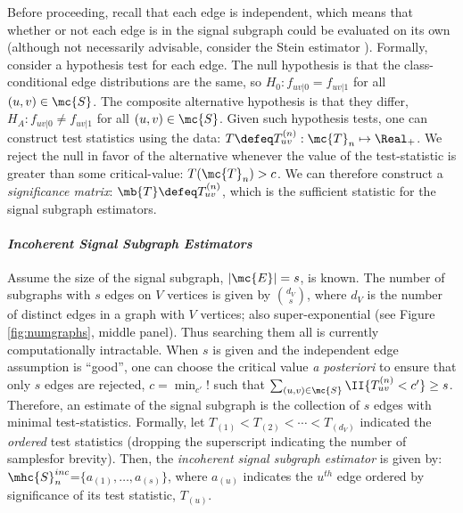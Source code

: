 \documentclass[10pt,journal,cspaper,compsoc]{IEEEtran}
\begin{document}
Before proceeding, recall that each edge is independent, which means that whether or not each edge is in the signal subgraph could be evaluated on its own (although not necessarily advisable, consider the Stein estimator \cite{Stein1956}).  Formally, consider a hypothesis test for each edge.  The null hypothesis is that the class-conditional edge distributions are the same, so $H_0: f_{uv|0}=f_{uv|1}$ for all $(u,v) \in \mc{S}$.  The composite alternative hypothesis is that they differ, $H_A: f_{uv|0} \neq f_{uv|1}$ for all $(u,v) \in \mc{S}$.  Given such hypothesis tests, one can construct test statistics using the data: $T \defeq T_{uv}^{(n)}: \mc{T}_n \mapsto \Real_+$.  We reject the null in favor of the alternative whenever the value of the test-statistic is greater than some critical-value: $T(\mc{T}_n)>c$.  We can therefore construct a \emph{significance matrix}: $\mb{T} \defeq T_{uv}^{(n)}$, which is the sufficient statistic for the signal subgraph estimators. %

\paragraph{\emph{Incoherent Signal Subgraph Estimators}} %
\label{par:paragraph_name}


Assume the size of the signal subgraph, $|\mc{E}|=s$, is known.  The number of subgraphs with $s$ edges on $V$ vertices is given by $\binom{d_V}{s}$, where $d_V$ is the number of distinct edges in a graph with $V$ vertices; also super-exponential (see Figure \ref{fig:numgraphs}, middle panel). Thus searching them all is currently computationally intractable.  When $s$ is given and the independent edge assumption is ``good'', one can choose the critical value \emph{a posteriori} to ensure that only $s$ edges are rejected, $c = \min_{c'}!$ such that $\sum_{(u,v) \in \mc{S}} \II \{T_{uv}^{(n)} < c'\} \geq s$.  Therefore, an estimate of the signal subgraph is the collection of $s$ edges with minimal test-statistics.  Formally, let $T_{(1)} < T_{(2)} < \cdots < T_{(d_V)}$ indicated the \emph{ordered} test statistics (dropping the superscript indicating the number of samplesfor brevity).  Then, the \emph{incoherent signal subgraph estimator} is given by: $\mhc{S}^{inc}_n$=$\{a_{(1)}, \ldots, a_{(s)}\}$, where $a_{(u)}$ indicates the $u^{th}$ edge ordered by significance of its test statistic, $T_{(u)}$.  %
\end{document}
